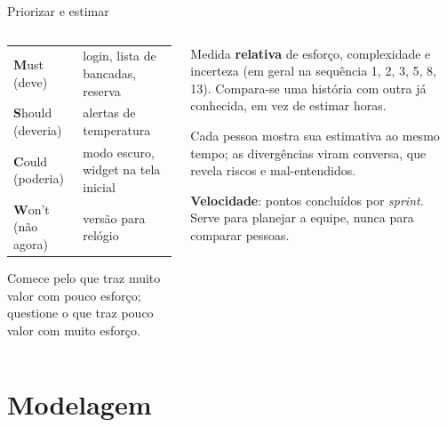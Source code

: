 \documentclass[aspectratio=169,10pt]{beamer}
\begin{document}
\begin{frame}{Priorizar e estimar}
  \begin{columns}[T]
    \begin{column}{0.5\textwidth}
      \scriptsize
      \begin{tabularx}{\linewidth}{@{}l L@{}}
        \toprule
         &  \\
        \midrule
        \textbf{M}ust (deve) & login, lista de bancadas, reserva \\
        \textbf{S}hould (deveria) & alertas de temperatura \\
        \textbf{C}ould (poderia) & modo escuro, widget na tela inicial \\
        \textbf{W}on't (não agora) & versão para relógio \\
        \bottomrule
      \end{tabularx}
      \begin{conceito}
        Comece pelo que traz muito valor com pouco esforço; questione o que traz pouco valor com muito esforço.
      \end{conceito}
    \end{column}
    \begin{column}{0.48\textwidth}
      \begin{definicao}
        Medida \textbf{relativa} de esforço, complexidade e incerteza (em geral na sequência 1, 2, 3, 5, 8, 13). Compara-se uma história com outra já conhecida, em vez de estimar horas.
      \end{definicao}
      \begin{conceito}
        Cada pessoa mostra sua estimativa ao mesmo tempo; as divergências viram conversa, que revela riscos e mal-entendidos.
      \end{conceito}
      \begin{dica}
        \textbf{Velocidade}: pontos concluídos por \emph{sprint}. Serve para planejar a equipe, nunca para comparar pessoas.
      \end{dica}
    \end{column}
  \end{columns}
\end{frame}

\section{Modelagem}
\end{document}
